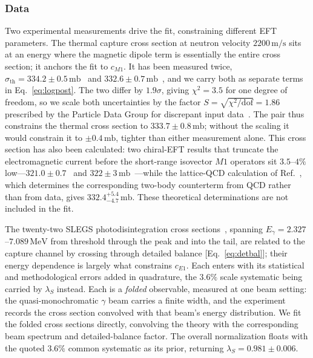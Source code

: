 \documentclass[
  aps,prd,twocolumn,nofootinbib,superscriptaddress,
  longbibliography,floatfix,preprintnumbers
]{revtex4-2}
\newcommand{\Egam}{E_{\gamma}}
\newcommand{\Mone}{M1}
\newcommand{\Eone}{E1}
\newcommand{\sigth}{\sigma_{\mathrm{th}}}
\begin{document}
\subsubsection{Data}
\label{sec:data}

Two experimental measurements drive the fit, constraining different EFT
parameters. The thermal capture cross section at neutron velocity
$2200\,\mathrm{m/s}$ sits at an energy where the magnetic dipole term is
essentially the entire cross section; it anchors the fit to $c_{\Mone}$. It has
been measured twice, $\sigth=334.2\pm0.5\,\mathrm{mb}$~\cite{Cox1965} and
$332.6\pm0.7\,\mathrm{mb}$~\cite{Cokinos:1977zz}, and we carry both as separate
terms in Eq.~\eqref{eq:logpost}. The two differ by $1.9\sigma$, giving
$\chi^{2}=3.5$ for one degree of freedom, so we scale both uncertainties by the
factor $S=\sqrt{\chi^{2}/\mathrm{dof}}=1.86$ prescribed by the Particle Data
Group for discrepant input data~\cite{ParticleDataGroup:2024cfk}. The pair thus
constrains the thermal cross section to $333.7\pm0.8\,\mathrm{mb}$; without the
scaling it would constrain it to $\pm0.4\,\mathrm{mb}$, tighter than either
measurement alone.
This cross section has also been calculated: two chiral-EFT results that truncate the electromagnetic current before the
short-range isovector $\Mone$ operators sit $3.5$--$4\%$
low---$321.0\pm0.7$~\cite{Acharya:2021lrv} and
$322\pm3\,\mathrm{mb}$~\cite{Du:2022zds}---while the lattice-QCD calculation of
Ref.~\cite{Beane:2015yha}, which determines the corresponding two-body
counterterm from QCD rather than from data, gives
$332.4^{+5.4}_{-4.7}\,\mathrm{mb}$. 
These theoretical determinations are not included in the fit.

The twenty-two SLEGS photodisintegration cross sections~\cite{Chen:2025oyj}, spanning
$\Egam=2.327$--$7.089\,\mathrm{MeV}$ from
threshold through the peak and into the tail, are related to the capture
channel by crossing through detailed balance [Eq.~\eqref{eq:detbal}]; their energy
dependence is largely what constrains $c_{\Eone}$. Each enters with its statistical and
methodological errors added in quadrature, the $3.6\%$ scale systematic being carried
by $\lambda_{S}$ instead. Each is a
\emph{folded} observable, measured at one beam setting: the quasi-monochromatic
$\gamma$ beam carries a finite width, and the experiment records the cross section
convolved with that beam's energy distribution. We fit the folded cross sections directly,
convolving the theory with the corresponding beam spectrum and detailed-balance factor. The overall normalization floats
with the quoted $3.6\%$ common systematic as its prior, returning
$\lambda_{S}=0.981\pm0.006$.
\end{document}
